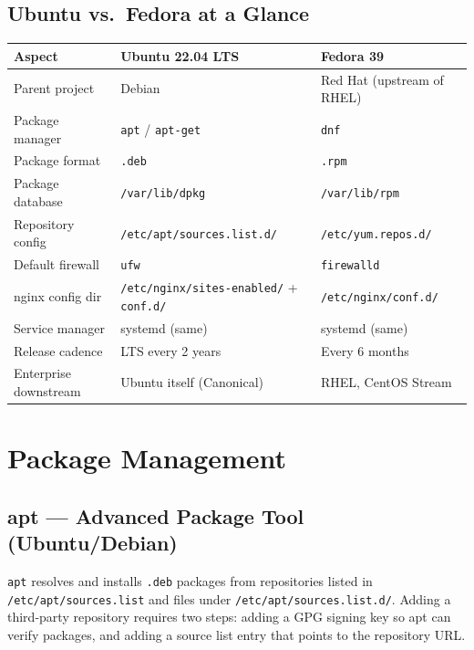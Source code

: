 \documentclass[11pt,a4paper]{article}
\begin{document}
\subsection{Ubuntu vs.\ Fedora at a Glance}

\begin{center}
\begin{tabular}{L{3.5cm}L{5.5cm}L{5cm}}
\toprule
\textbf{Aspect} & \textbf{Ubuntu 22.04 LTS} & \textbf{Fedora 39} \\
\midrule
Parent project      & Debian                    & Red Hat (upstream of RHEL) \\
Package manager     & \texttt{apt} / \texttt{apt-get} & \texttt{dnf} \\
Package format      & \texttt{.deb}             & \texttt{.rpm} \\
Package database    & \texttt{/var/lib/dpkg}    & \texttt{/var/lib/rpm} \\
Repository config   & \texttt{/etc/apt/sources.list.d/} & \texttt{/etc/yum.repos.d/} \\
Default firewall    & \texttt{ufw}              & \texttt{firewalld} \\
nginx config dir    & \texttt{/etc/nginx/sites-enabled/} + \texttt{conf.d/} & \texttt{/etc/nginx/conf.d/} \\
Service manager     & systemd (same)            & systemd (same) \\
Release cadence     & LTS every 2 years         & Every 6 months \\
Enterprise downstream & Ubuntu itself (Canonical) & RHEL, CentOS Stream \\
\bottomrule
\end{tabular}
\end{center}

\section{Package Management}
\label{sec:packages}

\subsection{apt — Advanced Package Tool (Ubuntu/Debian)}

\texttt{apt} resolves and installs \texttt{.deb} packages from repositories listed in \texttt{/etc/apt/sources.list} and files under \texttt{/etc/apt/sources.list.d/}. Adding a third-party repository requires two steps: adding a GPG signing key so apt can verify packages, and adding a source list entry that points to the repository URL.
\end{document}
